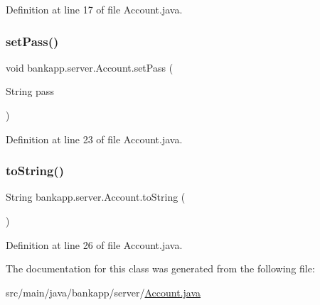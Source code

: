 Definition at line 17 of file Account.\+java.

\mbox{\label{classbankapp_1_1server_1_1_account_ab6a8bbb30450a1090fa9ee8770b25148}} 
\subsubsection{\texorpdfstring{set\+Pass()}{setPass()}}
{\footnotesize\ttfamily void bankapp.\+server.\+Account.\+set\+Pass (\begin{DoxyParamCaption}\item[{String}]{pass }\end{DoxyParamCaption})}



Definition at line 23 of file Account.\+java.

\mbox{\label{classbankapp_1_1server_1_1_account_af9ce01fe2afb9e196b9ea0ceb51eb3ae}} 
\subsubsection{\texorpdfstring{to\+String()}{toString()}}
{\footnotesize\ttfamily String bankapp.\+server.\+Account.\+to\+String (\begin{DoxyParamCaption}{ }\end{DoxyParamCaption})}



Definition at line 26 of file Account.\+java.



The documentation for this class was generated from the following file\+:\begin{DoxyCompactItemize}
\item 
src/main/java/bankapp/server/\hyperlink{_account_8java}{Account.\+java}\end{DoxyCompactItemize}
